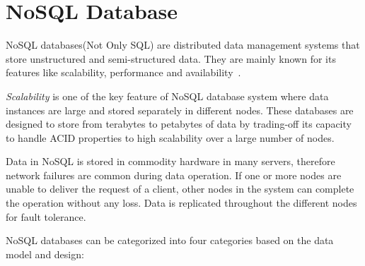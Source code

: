 	\section{NoSQL Database}
	NoSQL databases(Not Only SQL) are distributed data management systems that store unstructured and semi-structured data. They are mainly known for its features like scalability, performance and availability~\citep{hecht2011nosql}.
	
	\textit{Scalability} is one of the key feature of NoSQL database system  where data instances are large and stored separately in different nodes. These databases are designed to store from terabytes to petabytes of data by trading-off its capacity to handle ACID properties to high scalability over a large number of nodes\cite{abramova2013nosql}. 	
   \par  Data in NoSQL is stored in commodity hardware in many servers, therefore network failures are common during data operation. If one or more nodes are unable to deliver the request of a client,  other nodes in the system can complete the operation without any loss. Data is replicated throughout the different nodes for fault tolerance.%
    \par 
NoSQL databases can be categorized into four categories based on the data model and design:
